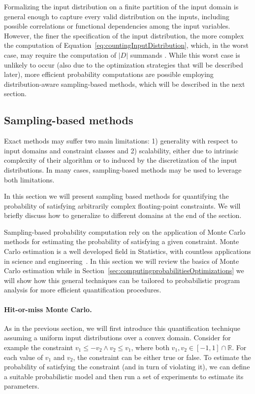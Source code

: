 Formalizing the input distribution on a finite partition of the input domain is general enough to capture every valid distribution on the inputs, including possible correlations or functional dependencies among the input variables. However, the finer the specification of the input distribution, the more complex the computation of Equation~\eqref{eq:countingInputDistribution}, which, in the worst case, may require the computation of $|D|$ summands \cite{Borges2014}. While this worst case is unlikely to occur (also due to the optimization strategies that will be described later), more efficient probability computations are possible employing distribution-aware sampling-based methods, which will be described in the next section.

\subsection{Sampling-based methods}\label{sec:computingprobabilitiesSampling}
Exact methods may suffer two main limitations: 1) generality with respect to input domains and constraint classes and 2) scalability, either due to intrinsic complexity of their algorithm or to induced by the discretization of the input distributions. In many cases, sampling-based methods may be used to leverage both limitations.

In this section we will present sampling based methods for quantifying the probability of satisfying arbitrarily complex floating-point constraints. We will briefly discuss how to generalize to different domains at the end of the section.

Sampling-based probability computation rely on the application of Monte Carlo methods for estimating the probability of satisfying a given constraint. Monte Carlo estimation is a well developed field in Statistics, with countless applications in science and engineering~\cite{Robert2005MCBook}. In this section we will review the basics of Monte Carlo estimation while in Section~\ref{sec:computingprobabilitiesOptimizations} we will show how this general techniques can be tailored to probabilistic program analysis for more efficient quantification procedures.

\paragraph{Hit-or-miss Monte Carlo.}

As in the previous section, we will first introduce this quantification technique assuming a uniform input distributions over a convex domain. Consider for example the constraint $v_1 \leq -v_2 \land v_2 \leq v_1$, where both $v_1, v_2 \in [-1, 1] \cap \mathbb{R}$. For each value of $v_1$ and $v_2$, the constraint can be either true or false. To estimate the probability of satisfying the constraint (and in turn of violating it), we can define a suitable probabilistic model and then run a set of experiments to estimate its parameters.

